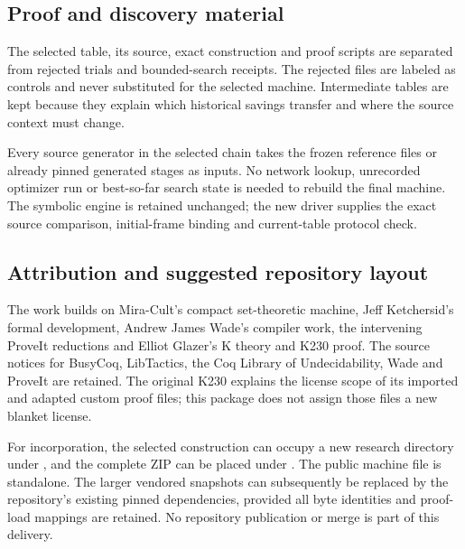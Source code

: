 \subsection{Proof and discovery material}

The selected table, its source, exact construction and proof scripts are
separated from rejected trials and bounded-search receipts. The rejected
files are labeled as controls and never substituted for the selected
machine. Intermediate tables are kept because they explain which
historical savings transfer and where the source context must change.

Every source generator in the selected chain takes the frozen reference
files or already pinned generated stages as inputs. No network lookup,
unrecorded optimizer run or best-so-far search state is needed to rebuild
the final machine. The symbolic engine is retained unchanged; the new
driver supplies the exact source comparison, initial-frame binding and
current-table protocol check.

\subsection{Attribution and suggested repository layout}

The work builds on Mira-Cult's compact set-theoretic machine, Jeff
Ketchersid's formal development, Andrew James Wade's compiler work,
the intervening ProveIt reductions and Elliot Glazer's K theory and
K230 proof. The source notices for BusyCoq, LibTactics, the Coq Library
of Undecidability, Wade and ProveIt are retained. The original K230
 explains the license scope of its imported and
adapted custom proof files; this package does not assign those files a
new blanket license.

For incorporation, the selected construction can occupy a new research
directory under
, and the complete ZIP can be
placed under . The public machine file is standalone.
The larger vendored snapshots can subsequently be replaced by the
repository's existing pinned dependencies, provided all byte identities
and proof-load mappings are retained. No repository publication or merge
is part of this delivery.
